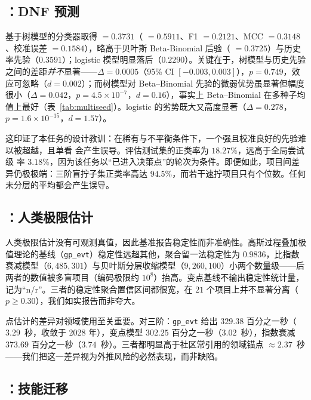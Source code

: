 \subsection{：DNF 预测}
\label{sec:results-t3}

基于树模型的分类器取得 \aucpr{} $=0.3731$（\aucroc{} $=0.5911$、F1 $=0.2121$、MCC $=0.3148$、校准误差 $=0.1584$），略高于贝叶斯 Beta-Binomial 后验（\aucpr{} $=0.3725$）与历史率先验（$0.3591$）；logistic 模型明显落后（$0.2290$）。关键在于，树模型与历史先验之间的差距\emph{并不}显著——$\Delta=0.0005$（95\% CI $[-0.003,0.003]$），$p=0.749$，效应可忽略（$d=0.002$）；而树模型对 Beta--Binomial 先验的微弱优势虽显著但幅度很小（$\Delta=0.042$，$p=4.5\times10^{-7}$，$d=0.16$），事实上 Beta--Binomial 在多种子均值上最好（表~\ref{tab:multiseed}）。logistic 的劣势既大又高度显著（$\Delta=0.278$，$p=1.6\times10^{-15}$，$d=1.57$）。

这印证了本任务的设计教训：在稀有与不平衡条件下，一个强且校准良好的先验难以被超越，且单看 \aucroc{} 会产生误导。评估测试集的正类率为 $18.27\%$，远高于全局尝试级 \DNF{} 率 $3.18\%$，因为该任务以“已进入决策点”的轮次为条件。即便如此，项目间差异仍极极端：三阶盲拧子集正类率高达 $94.5\%$，而若干速拧项目只有个位数。任何未分层的平均都会产生误导。

\subsection{：人类极限估计}
\label{sec:results-t4}

人类极限估计没有可观测真值，因此基准报告稳定性而非准确性。高斯过程叠加极值理论的基线（\texttt{gp\_evt}）稳定性远超其他，聚合留一法稳定性为 $0.9836$，比指数衰减模型（$6{,}485{,}301$）与贝叶斯分层收缩模型（$9{,}260{,}100$）小两个数量级——后两者的数值被多盲项目（编码极限约 $10^8$）抬高。变点基线不输出稳定性统计量，记为“n/r”。三者的稳定性聚合置信区间都很宽，在 $21$ 个项目上并不显著分离（$p\ge0.30$），我们如实报告而非夸大。

点估计的差异对领域使用至关重要。对三阶：\texttt{gp\_evt} 给出 $329.38$ 百分之一秒（$3.29$~秒，收敛于 2028 年），变点模型 $302.25$ 百分之一秒（$3.02$~秒），指数衰减 $373.69$ 百分之一秒（$3.74$~秒）。三者都明显高于社区常引用的领域锚点 $\approx 2.37$~秒——我们把这一差异视为外推风险的必然表现，而非缺陷。

\subsection{：技能迁移}
\label{sec:results-t5}

